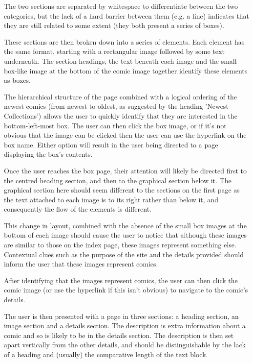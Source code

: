 \documentclass{scrreprt}
\begin{document}
The two sections are separated by whitespace to differentiate between the two categories, but the lack of a hard barrier between them (e.g. a line) indicates that they are still related to some extent (they both present a series of boxes).

These sections are then broken down into a series of elements. Each element has the same format, starting with a rectangular image followed by some text underneath. The section headings, the text beneath each image and the small box-like image at the bottom of the comic image together identify these elements as boxes.

The hierarchical structure of the page combined with a logical ordering of the newest comics (from newest to oldest, as suggested by the heading 'Newest Collections') allows the user to quickly identify that they are interested in the bottom-left-most box. The user can then click the box image, or if it's not obvious that the image can be clicked then the user can use the hyperlink on the box name. Either option will result in the user being directed to a page displaying the box's contents.

Once the user reaches the box page, their attention will likely be directed first to the centred heading section, and then to the graphical section below it. The graphical section here should seem different to the sections on the first page as the text attached to each image is to its right rather than below it, and consequently the flow of the elements is different.

This change in layout, combined with the absence of the small box images at the bottom of each image should cause the user to notice that although these images are similar to those on the index page, these images represent something else. Contextual clues such as the purpose of the site and the details provided should inform the user that these images represent comics.

After identifying that the images represent comics, the user can then click the comic image (or use the hyperlink if this isn't obvious) to navigate to the comic's details.

The user is then presented with a page in three sections: a heading section, an image section and a details section. The description is extra information about a comic and so is likely to be in the details section. The description is then set apart vertically from the other details, and should be distinguishable by the lack of a heading and (usually) the comparative length of the text block.
\end{document}
